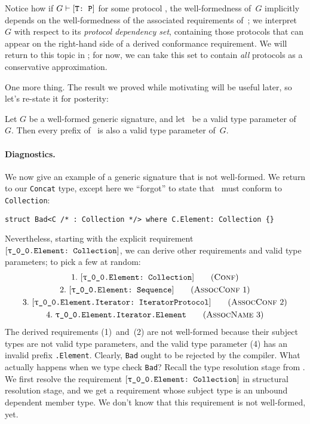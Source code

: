 \documentclass[../generics]{subfiles}
\begin{document}
Notice how if $G\vdash[\texttt{T:~P}]$ for some protocol \tP, the well-formedness of~$G$ implicitly depends on the well-formedness of the associated requirements of~\tP; we interpret~$G$ with respect to its \emph{protocol dependency set}, containing those protocols that can appear on the right-hand side of a derived conformance requirement. We will return to this topic in ; for now, we can take this set to contain \emph{all} protocols as a conservative approximation.

One more thing. The result we proved while motivating  will be useful later, so let's re-state it for posterity:
\begin{proposition}\label{prefix prop}
Let $G$ be a well-formed generic signature, and let \tT\ be a valid type parameter of~$G$. Then every prefix of \tT\ is also a valid type parameter of~$G$.
\end{proposition}

\paragraph{Diagnostics.} We now give an example of a generic signature that is not well-formed. We return to our \texttt{Concat} type, except here we ``forgot'' to state that \tC\ must conform to \texttt{Collection}:
\begin{Verbatim}
struct Bad<C /* : Collection */> where C.Element: Collection {}
\end{Verbatim}
Nevertheless, starting with the explicit requirement $\ConfReq{\rT.Element}{Collection}$, we can derive other requirements and valid type parameters; to pick a few at random:
\begin{gather*}
\ConfStep{\rT.Element}{Collection}{1}\\
\AssocConfStep{1}{\rT.Element}{Sequence}{2}\\
\AssocConfStep{2}{\rT.Element.Iterator}{IteratorProtocol}{3}\\
\AssocNameStep{3}{\rT.Element.Iterator.Element}{4}
\end{gather*}
The derived requirements (1)~and~(2) are not well-formed because their subject types are not valid type parameters, and the valid type parameter (4) has an invalid prefix \texttt{\rT.Element}. Clearly, \texttt{Bad} ought to be rejected by the compiler. What actually happens when we type check \texttt{Bad}? Recall the type resolution stage from . We first resolve the requirement $\ConfReq{\rT.Element}{Collection}$ in structural resolution stage, and we get a requirement whose subject type is an unbound dependent member type. We don't know that this requirement is not well-formed, yet.
\end{document}
